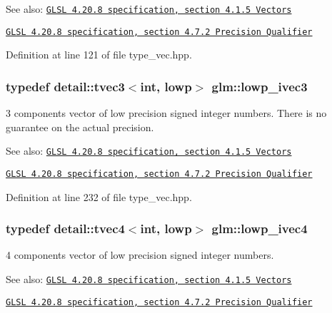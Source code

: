 \begin{Desc}
\item[See also:]\href{http://www.opengl.org/registry/doc/GLSLangSpec.4.20.8.pdf}{\tt GLSL 4.20.8 specification, section 4.1.5 Vectors} 

\href{http://www.opengl.org/registry/doc/GLSLangSpec.4.20.8.pdf}{\tt GLSL 4.20.8 specification, section 4.7.2 Precision Qualifier} \end{Desc}


Definition at line 121 of file type\_\-vec.hpp.\hypertarget{group__core__precision_gd133fec5c629e3f712c1270e15144e6c}{
\subsubsection[lowp\_\-ivec3]{\setlength{\rightskip}{0pt plus 5cm}typedef detail::tvec3$<$int, lowp$>$ {\bf glm::lowp\_\-ivec3}}}
\label{group__core__precision_gd133fec5c629e3f712c1270e15144e6c}


3 components vector of low precision signed integer numbers. There is no guarantee on the actual precision.

\begin{Desc}
\item[See also:]\href{http://www.opengl.org/registry/doc/GLSLangSpec.4.20.8.pdf}{\tt GLSL 4.20.8 specification, section 4.1.5 Vectors} 

\href{http://www.opengl.org/registry/doc/GLSLangSpec.4.20.8.pdf}{\tt GLSL 4.20.8 specification, section 4.7.2 Precision Qualifier} \end{Desc}


Definition at line 232 of file type\_\-vec.hpp.\hypertarget{group__core__precision_gb9b404ae623385d5094499d2d4e4616d}{
\subsubsection[lowp\_\-ivec4]{\setlength{\rightskip}{0pt plus 5cm}typedef detail::tvec4$<$int, lowp$>$ {\bf glm::lowp\_\-ivec4}}}
\label{group__core__precision_gb9b404ae623385d5094499d2d4e4616d}


4 components vector of low precision signed integer numbers.

\begin{Desc}
\item[See also:]\href{http://www.opengl.org/registry/doc/GLSLangSpec.4.20.8.pdf}{\tt GLSL 4.20.8 specification, section 4.1.5 Vectors} 

\href{http://www.opengl.org/registry/doc/GLSLangSpec.4.20.8.pdf}{\tt GLSL 4.20.8 specification, section 4.7.2 Precision Qualifier} \end{Desc}


